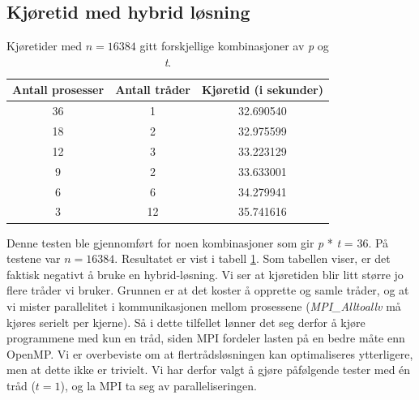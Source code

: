 \documentclass{article}
\begin{document}
\subsection{Kjøretid med hybrid løsning}
\label{subsection:runtime}
\begin{table}
\begin{center}
	
	\begin{tabular}{c | c | c}
	\hline \hline 
	Antall prosesser      &    Antall tråder     &    Kjøretid (i sekunder) 	    \\ \hline	
	36		      &		1	     &	  32.690540       		    \\ \hline
	18		      &         2	     &    32.975599       		    \\ \hline
	12		      &         3	     &    33.223129	    		    \\ \hline
	9   		      &		2	     &    33.633001	    		    \\ \hline
	6		      &         6	     &    34.279941	    		    \\ \hline
	3		      &		12	     &    35.741616	    		    \\ \hline
	
	\end{tabular}
\end{center}
\caption{Kjøretider med $n = 16384$ gitt forskjellige kombinasjoner av \emph{p} og \emph{t}.}
\label{p/t-table}
\end{table}

Denne testen ble gjennomført for noen kombinasjoner som gir \emph{p} * \emph{t} = 36. På testene var $n = 16384$. Resultatet er vist i tabell \ref{p/t-table}. Som tabellen viser, er det faktisk negativt å bruke en hybrid-løsning. Vi ser at kjøretiden blir litt større jo flere tråder vi bruker. Grunnen er at det koster å opprette og samle tråder, og at vi mister parallelitet i kommunikasjonen mellom prosessene (\emph{MPI\_Alltoallv} må kjøres serielt per kjerne). Så i dette tilfellet lønner det seg derfor å kjøre programmene med kun en tråd, siden MPI fordeler lasten på en bedre måte enn OpenMP. Vi er overbeviste om at flertrådsløsningen kan optimaliseres ytterligere, men at dette ikke er trivielt. Vi har derfor valgt å gjøre påfølgende tester med én tråd ($t=1$), og la MPI ta seg av paralleliseringen.
\end{document}
